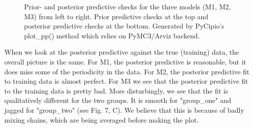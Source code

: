 \documentclass{article}
\begin{document}
\begin{figure}[H]
    \centering
    \quad
    \quad
    \caption{Prior- and posterior predictive checks for the three models (M1, M2, M3) from left to right. Prior predictive checks at the top and posterior predictive checks at the bottom. Generated by PyCipio's plot\_pp() method which relies on PyMC3/Arviz backend.}
\end{figure}

\noindent When we look at the posterior predictive against the true (training) data, the overall picture is the same. For M1, the posterior predictive is reasonable, but it does miss some of the periodicity in the data. 
For M2, the posterior predictive fit to training data is almost perfect.
For M3 we see that the posterior predictive fit to the training data is pretty bad. 
More disturbingly, we see that the fit is qualitatively different for the two groups. 
It is smooth for "group\_one" and jagged for "group\_two" (see Fig. 7, C). We believe that this is because of badly mixing chains, 
which are being averaged before making the plot. 
\end{document}
